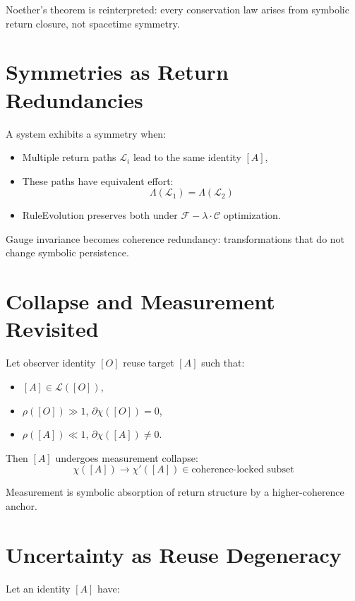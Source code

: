 Noether’s theorem is reinterpreted: every conservation law arises from symbolic return closure, not spacetime symmetry.

\section{Symmetries as Return Redundancies} \label{sec:symmetries}

A system exhibits a symmetry when:

\begin{itemize}
  \item Multiple return paths $\mathcal{L}_i$ lead to the same identity $[A]$,
  \item These paths have equivalent effort:
  \[
  \Lambda(\mathcal{L}_1) = \Lambda(\mathcal{L}_2)
  \]
  \item RuleEvolution preserves both under $\mathcal{F} - \lambda \cdot \mathcal{C}$ optimization.
\end{itemize}

Gauge invariance becomes coherence redundancy: transformations that do not change symbolic persistence.

\section{Collapse and Measurement Revisited} \label{sec:measurement-collapse}

Let observer identity $[O]$ reuse target $[A]$ such that:

\begin{itemize}
  \item $[A] \in \mathcal{L}([O])$,
  \item $\rho([O]) \gg 1$, $\partial\chi([O]) = 0$,
  \item $\rho([A]) \ll 1$, $\partial\chi([A]) \ne 0$.
\end{itemize}

Then $[A]$ undergoes measurement collapse:
\[
\chi([A]) \to \chi'([A]) \in \text{coherence-locked subset}
\]

Measurement is symbolic absorption of return structure by a higher-coherence anchor.

\section{Uncertainty as Reuse Degeneracy} \label{sec:uncertainty}

Let an identity $[A]$ have:


